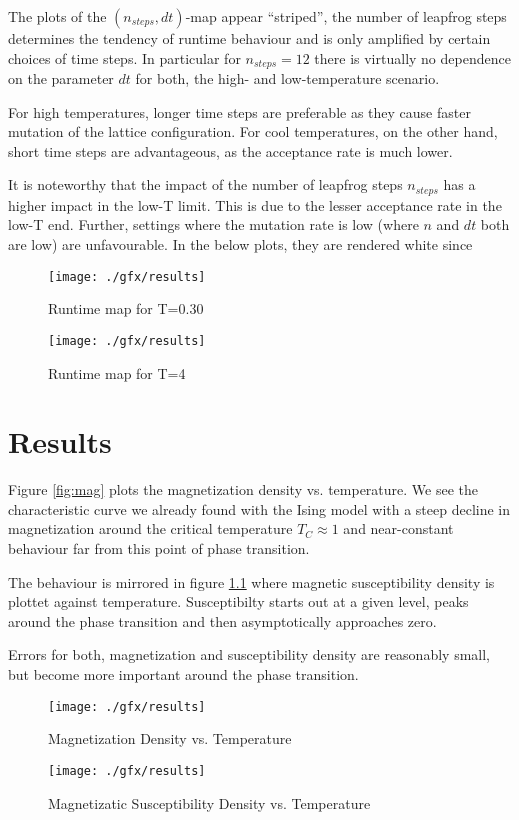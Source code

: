 The plots of the $(n_{steps}, dt)$-map appear \enquote{striped}, \ie the number of leapfrog steps determines the tendency of runtime behaviour and is only amplified by certain choices of time steps. In particular for $n_{steps} = 12$ there is virtually no dependence on the parameter $dt$ for both, the high- and low-temperature scenario.

For high temperatures, longer time steps are preferable as they cause faster mutation of the lattice configuration. For cool temperatures, on the other hand, short time steps are advantageous, as the acceptance rate is much lower.

It is noteworthy that the impact of the number of leapfrog steps $n_{steps}$ has a higher impact in the low-T limit. This is due to the lesser acceptance rate in the low-T end. Further, settings where the mutation rate is low (\ie where $n$ and $dt$ both are low) are unfavourable. In the below plots, they are rendered white since 

\begin{figure}
	\texttt{[image: ./gfx/results]}
	\caption{Runtime map for T=0.30} \label{fig:runtimeT1}
	\texttt{[image: ./gfx/results]}
	\caption{Runtime map for T=4} \label{fig:runtimeT4}
\end{figure}

\chapter{Results}
Figure \ref{fig:mag} plots the magnetization density vs. temperature. We see the characteristic curve we already found with the Ising model with a steep decline in magnetization around the critical temperature $T_C \approx 1$ and near-constant behaviour far from this point of phase transition.

The behaviour is mirrored in figure \ref{fig:chi} where magnetic susceptibility density is plottet against temperature. Susceptibilty starts out at a given level, peaks around the phase transition and then asymptotically approaches zero.

Errors for both, magnetization and susceptibility density are reasonably small, but become more important around the phase transition.

\begin{figure}
	\texttt{[image: ./gfx/results]}
	\caption{Magnetization Density vs. Temperature} \label{fig:mag}
	\texttt{[image: ./gfx/results]}
	\caption{Magnetizatic Susceptibility Density vs. Temperature} \label{fig:chi}
\end{figure}